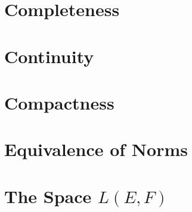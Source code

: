 \section{Completeness}
\section{Continuity}
\section{Compactness}
\section{Equivalence of Norms}
\section{The Space \( L(E,F) \)}

